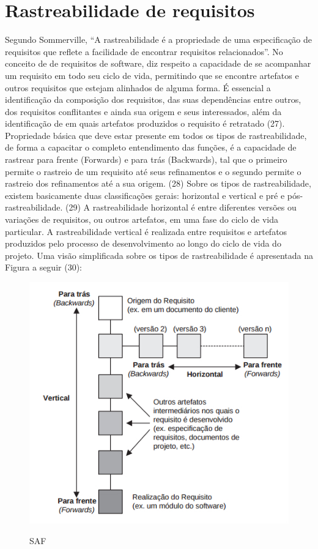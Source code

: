 \section{Rastreabilidade de requisitos}

Segundo Sommerville, “A rastreabilidade é a propriedade de uma especificação de requisitos que reflete a facilidade de encontrar requisitos relacionados”. No conceito de de requisitos de software, diz respeito a capacidade de se acompanhar um requisito em todo seu ciclo de vida, permitindo que se encontre artefatos e outros requisitos que estejam alinhados de alguma forma. É essencial a identificação da composição dos requisitos, das suas dependências entre outros, dos requisitos conflitantes e ainda sua origem e seus interessados, além da identificação de em quais artefatos produzidos o requisito é retratado (27).
Propriedade básica que deve estar presente em todos os tipos de rastreabilidade, de forma a capacitar o completo entendimento das funções, é a capacidade de rastrear para frente (Forwards) e para trás (Backwards), tal que o primeiro permite o rastreio de um requisito até seus refinamentos e  o segundo permite o rastreio dos refinamentos até a sua origem. (28)
Sobre os tipos de rastreabilidade, existem basicamente duas classificações gerais: horizontal e vertical e pré e pós-rastreabilidade. (29)
A rastreabilidade horizontal é entre diferentes versões ou variações de requisitos, ou outros artefatos, em uma fase do ciclo de vida particular. A rastreabilidade vertical é realizada entre requisitos e artefatos produzidos pelo processo de desenvolvimento ao longo do ciclo de vida do projeto.
Uma visão simplificada sobre os tipos de rastreabilidade é apresentada na Figura a seguir (30):

\FloatBarrier
\begin{figure}[!htpd]
		\centering
		\caption{SAF}
		\includegraphics[scale=0.27]{figuras/Rastreabilidade}
		\label{img:SAF}
\end{figure}
\FloatBarrier

